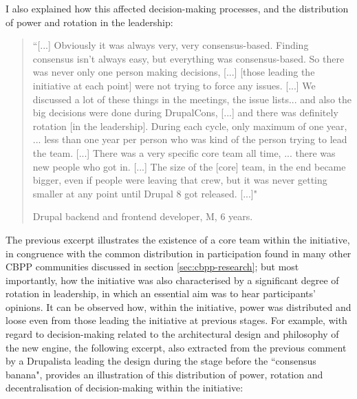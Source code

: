 I also explained how this affected decision-making processes, and the distribution of power and rotation in the leadership:

\begin{quotation}
``[...] Obviously it was always very, very consensus-based. Finding consensus isn't always easy, but everything was consensus-based. So there was never only one person making decisions, [...] [those leading the initiative at each point] were not trying to force any issues. [...] We discussed a lot of these things in the meetings, the issue lists... and also the big decisions were done during DrupalCons, [...] and there was definitely rotation [in the leadership]. During each cycle, only maximum of one year, ... less than one year per person who was kind of the person trying to lead the team. [...] There was a very specific core team all time, ... there was new people who got in. [...] The size of the [core] team, in the end became bigger, even if people were leaving that crew, but it was never getting smaller at any point until Drupal 8 got released. [...]"

\begin{flushright}\footnotesize{Drupal backend and frontend developer, M, 6 years.}\end{flushright}
\end{quotation}

The previous excerpt illustrates the existence of a core team within the initiative, in congruence with the common distribution in participation found in many other CBPP communities discussed in section \ref{sec:cbpp-research}; but most importantly, how the initiative was also characterised by a significant degree of rotation in leadership, in which an essential aim was to hear participants' opinions. It can be observed how, within the initiative, power was distributed and loose even from those leading the initiative at previous stages. For example, with regard to decision-making related to the architectural design and philosophy of the new engine, the following excerpt, also extracted from the previous comment by a Drupalista leading the design during the stage before the ``consensus banana", provides an illustration of this distribution of power, rotation and decentralisation of decision-making within the initiative:

